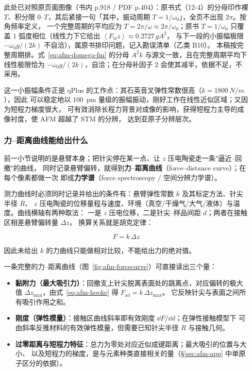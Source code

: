 此处已对照原页面图像（书内 p.918 / PDF p.404）：原书式（12-4）的分母印作裸 $T$、积分限
$0$--$T$，其后紧接一句「其中，振动周期 $T=1/\omega_0$」，全页不出现 $2\pi$。按角频率定义，
一个完整周期的平均应为 $T=2\pi/\omega\approx2\pi/\omega_0$；原书 $T=1/\omega_0$ 只覆盖 $1$
弧度相位（线性力下它给出 $\left\langle F_{\mathrm{ts}}z\right\rangle\approx0.2727\,gA^{2}$，
与下一段的小振幅极限 $-\omega_0g/(2k)$ 不自洽），属原书排印问题，记入勘误清单（乙类 B10）。
本稿按完整周期排。式~\eqref{eq:afm-domega-fm} 的分母 $A^{2}k$ 与源文一致，且在完整周期平均下
线性极限恰为 $-\omega_0g/(2k)$，自洽；在分母补因子 $2$ 会使其减半，依据不足，不采用。

这一小振幅条件正是 qPlus 的工作点：其石英音叉弹性常数很高（$k=\qty{1800}{N/m}$），因此
可以稳定地以 \qty{100}{pm} 量级的振幅振动，刚好工作在线性近似区域；又因为短程力梯度很大，
可有效消除长程力背景对成像的影响，获得短程力主导的成像衬度，使 AFM 超越了 STM 的分辨，
达到亚原子分辨层次。

\subsubsection{力--距离曲线能给出什么}
\label{sec:afm-forcecurve}

前一小节说明的是悬臂本身；把针尖停在某一点、让 $z$ 压电陶瓷走一条"逼近--回撤"的曲线，
同时记录悬臂偏转，就得到\textbf{力--距离曲线}（force--distance curve）；在每个像素都做一次
即成\textbf{力学谱}（force spectroscopy / 空间分辨力学谱）。

\begin{measure}
测力曲线时必须同时记录并给出的条件有：悬臂弹性常数 $k$ 及其标定方法、针尖半径 $R$、
$z$ 压电陶瓷的位移量程与速度、环境（真空/干燥气/大气/液体）与温度。曲线横轴有两种取法：
一是 $z$ 压电位移，二是针尖--样品间距 $d$；两者在接触区相差悬臂偏转量 $\Delta z$，
换算关系就是胡克定律：

\begin{equation}\label{eq:afm-hooke}
F=k\,\Delta z
\end{equation}

因此未给出 $k$ 的力曲线只能做相对比较，不能给出力的绝对值。
\end{measure}

一条完整的力--距离曲线（图~\ref{fig:afm-forcecurve}）可直接读出三个量：

\begin{itemize}
\item \textbf{黏附力（最大吸引力）}：回撤支上针尖脱离表面处的跳离点，对应偏转的极大值
$\Delta z_{\max}$，由式~\eqref{eq:afm-hooke} 得 $F_{\mathrm{ad}}=k\,\Delta z_{\max}$。
它反映针尖与表面之间所有吸引作用之和。
\item \textbf{刚度（弹性模量）}：接触区曲线斜率即有效刚度 $\dd F/\dd d$；在弹性接触模型下
可由斜率反推材料的有效弹性模量，但需要已知针尖半径 $R$ 与接触几何。
\item \textbf{过零距离与短程力特征}：总力为零处对应近似成键距离；最大吸引的位置与大小、
以及短程力的梯度，是与元素种类直接相关的量（§\ref{sec:afm-app} 中单原子区分的依据）。
\end{itemize}

